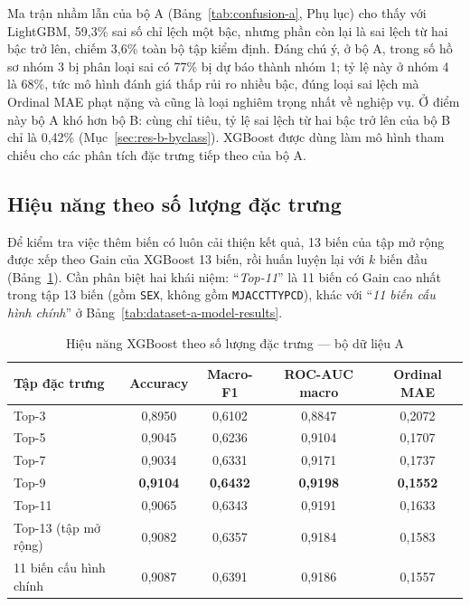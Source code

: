 Ma trận nhầm lẫn của bộ A (Bảng~\ref{tab:confusion-a}, Phụ lục) cho thấy với LightGBM, 59,3\% sai số chỉ lệch một bậc, nhưng phần còn lại là sai lệch từ hai bậc trở lên, chiếm 3,6\% toàn bộ tập kiểm định. Đáng chú ý, ở bộ A, trong số hồ sơ nhóm 3 bị phân loại sai có 77\% bị dự báo thành nhóm 1; tỷ lệ này ở nhóm 4 là 68\%, tức mô hình đánh giá thấp rủi ro nhiều bậc, đúng loại sai lệch mà Ordinal MAE phạt nặng và cũng là loại nghiêm trọng nhất về nghiệp vụ. Ở điểm này bộ A khó hơn bộ B: cùng chỉ tiêu, tỷ lệ sai lệch từ hai bậc trở lên của bộ B chỉ là 0,42\% (Mục~\ref{sec:res-b-byclass}). XGBoost được dùng làm mô hình tham chiếu cho các phân tích đặc trưng tiếp theo của bộ A.

\subsection{Hiệu năng theo số lượng đặc trưng}
\label{sec:res-a-topk}

Để kiểm tra việc thêm biến có luôn cải thiện kết quả, 13 biến của tập mở rộng được xếp theo Gain của XGBoost 13 biến, rồi huấn luyện lại với $k$ biến đầu (Bảng~\ref{tab:dataset-a-top-k}). Cần phân biệt hai khái niệm: ``\textit{Top-11}'' là 11 biến có Gain cao nhất trong tập 13 biến (gồm \texttt{SEX}, không gồm \mbox{\texttt{MJACCTTYPCD}}), khác với ``\textit{11 biến cấu hình chính}'' ở Bảng~\ref{tab:dataset-a-model-results}.

\begin{table}[H]
\centering
\caption{Hiệu năng XGBoost theo số lượng đặc trưng --- bộ dữ liệu A}
\label{tab:dataset-a-top-k}
\begin{tabular}{|l|c|c|c|c|}
\hline
Tập đặc trưng & Accuracy & Macro-F1 & ROC-AUC macro & Ordinal MAE\\
\hline
Top-3 & 0,8950 & 0,6102 & 0,8847 & 0,2072\\
Top-5 & 0,9045 & 0,6236 & 0,9104 & 0,1707\\
Top-7 & 0,9034 & 0,6331 & 0,9171 & 0,1737\\
Top-9 & \textbf{0,9104} & \textbf{0,6432} & \textbf{0,9198} & \textbf{0,1552}\\
Top-11 & 0,9065 & 0,6343 & 0,9191 & 0,1633\\
Top-13 (tập mở rộng) & 0,9082 & 0,6357 & 0,9184 & 0,1583\\
\hline
11 biến cấu hình chính & 0,9087 & 0,6391 & 0,9186 & 0,1557\\
\hline
\end{tabular}
\end{table}

